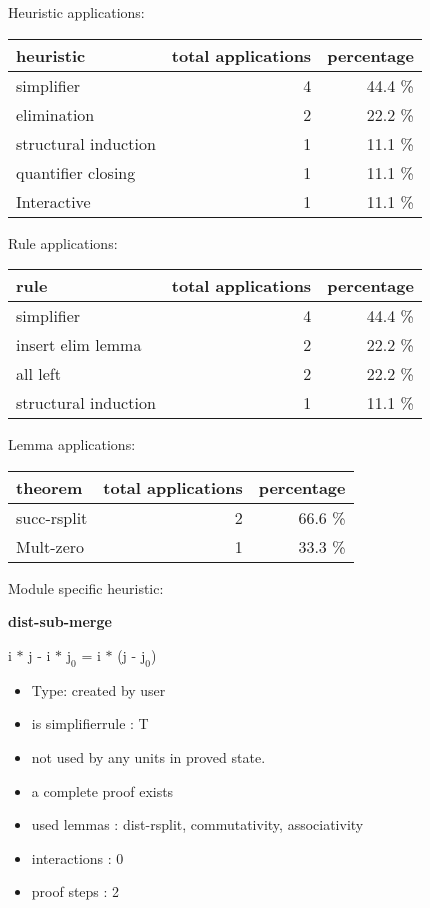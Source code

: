 \documentclass[a4paper]{article}
\begin{document}
\medskip


Heuristic applications:

\begin{supertabular}{l|r|r}
heuristic	& total applications & percentage \\ \hline
simplifier & 4 & 44.4 \% \\
elimination & 2 & 22.2 \% \\
structural induction & 1 & 11.1 \% \\
quantifier closing & 1 & 11.1 \% \\
Interactive & 1 & 11.1 \% \\

\end{supertabular}

Rule applications:

\begin{supertabular}{l|r|r}
rule	        & total applications & percentage \\ \hline
simplifier & 4 & 44.4 \% \\
insert elim lemma & 2 & 22.2 \% \\
all left & 2 & 22.2 \% \\
structural induction & 1 & 11.1 \% \\

\end{supertabular}

Lemma applications:

\begin{supertabular}{l|r|r}
theorem	        & total applications & percentage \\ \hline
succ-rsplit & 2 & 66.6 \% \\
Mult-zero & 1 & 33.3 \% \\

\end{supertabular}

Module specific heuristic:

\pagebreak

{\LARGE\bf dist-sub-merge}\label{lemma-dist-sub-merge}

\medskip

 \Fol i $*$ j - i $*$ $\mbox{j}_{0}$ = i $*$ (j - $\mbox{j}_{0}$)

\begin{itemize}

\item Type: created by user

\item is simplifierrule : T
\item not used by any units in proved state.
\item       a complete proof exists
\item       used lemmas  : dist-rsplit, commutativity, associativity
\item       interactions : 0
\item       proof steps  : 2
\end{itemize}
\end{document}
